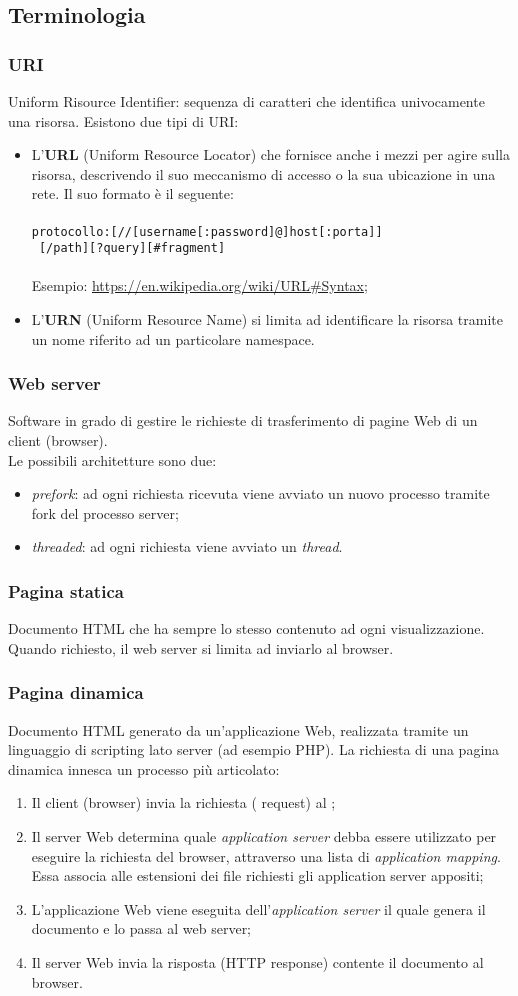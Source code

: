 \documentclass[a4paper, twoside]{article}
\def\code#1{\texttt{#1}}
\def\subsub#1{\subsubsection{#1}\label{#1}}
\def\vedi#1{\nameref{#1}}
\def\italic#1{\textit{#1}}
\begin{document}
\subsection{Terminologia} 
\subsub{URI} Uniform Risource Identifier: sequenza di caratteri che identifica univocamente una risorsa. Esistono due tipi di URI:
\begin{itemize}
\item L'\textbf{URL} (Uniform Resource Locator) che fornisce anche i mezzi per agire sulla risorsa, descrivendo il suo meccanismo di accesso o la sua ubicazione in una rete. Il suo formato è il seguente:\\\ \\ \code{protocollo:[//[username[:password]@]host[:porta]]\\ \ [/path][?query][\#fragment]}
\\\ \\
Esempio: \url{https://en.wikipedia.org/wiki/URL#Syntax};
\item L'\textbf{URN} (Uniform Resource Name) si limita ad identificare la risorsa tramite un nome riferito ad un particolare namespace.
\end{itemize}
\subsub{Web server}
Software in grado di gestire le richieste di trasferimento di pagine Web di un client (browser).\\ Le possibili architetture sono due:
\begin{itemize}
\item \italic{prefork}: ad ogni richiesta ricevuta viene avviato un nuovo processo tramite fork del processo server;
\item \italic{threaded}: ad ogni richiesta viene avviato un \italic{thread}.
\end{itemize}
\subsub{Pagina statica}
Documento HTML che ha sempre lo stesso contenuto ad ogni visualizzazione. Quando richiesto, il web server si limita ad inviarlo al browser.
\subsub{Pagina dinamica}
Documento HTML generato da un'applicazione Web, realizzata tramite un linguaggio di scripting lato server (ad esempio PHP). La richiesta di una pagina dinamica innesca un processo più articolato:\ 
\begin{enumerate}
\item Il client (browser) invia la richiesta (\vedi{HTTP} request) al \vedi{Web server};
\item Il server Web determina quale \textit{application server} debba essere utilizzato per eseguire la richiesta del browser, attraverso una lista di \italic{application mapping}. Essa associa alle estensioni dei file richiesti gli  application server appositi;
\item L'applicazione Web viene eseguita dell'\italic{application server} il quale genera il documento e lo passa al web server;
\item Il server Web invia la risposta (HTTP response) contente il documento al browser.
\end{enumerate}
\end{document}
